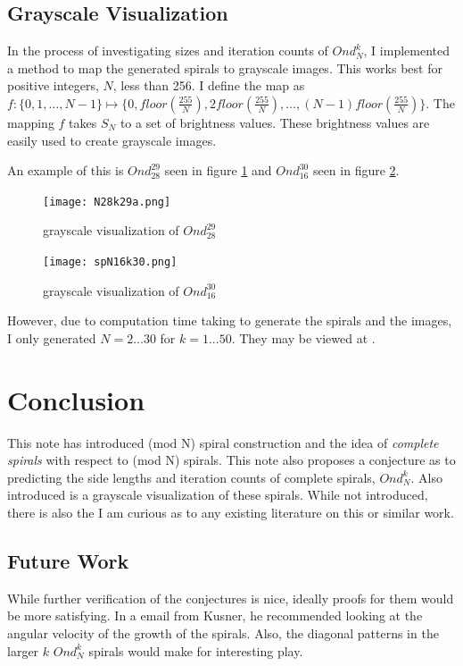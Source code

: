 \documentclass[11pt]{amsart}
\theoremstyle{mydef}
\begin{document}
\subsection{Grayscale Visualization}

In the process of investigating sizes and iteration counts of $Ond^k_N$, I implemented a method to map the generated spirals to grayscale images. This works best for positive integers, $N$, less than 256. I define the map as $f : \{ 0, 1, \ldots, N-1 \} \mapsto \{ 0, floor(\frac{255}{N}), 2floor(\frac{255}{N}), \ldots, (N-1)floor(\frac{255}{N}) \}$. The mapping $f$ takes $S_N$ to a set of brightness values. These brightness values are easily used to create grayscale images.

An example of this is $Ond^{29}_{28}$ seen in figure \ref{fig:viz2928} and $Ond^{30}_{16}$ seen in figure \ref{fig:viz1630}.

\begin{figure}[h]
\centering
\texttt{[image: N28k29a.png]}
\caption{grayscale visualization of $Ond^{29}_{28}$}
\label{fig:viz2928}
\end{figure}

\begin{figure}
\centering
\texttt{[image: spN16k30.png]}
\caption{grayscale visualization of $Ond^{30}_{16}$}
\label{fig:viz1630}
\end{figure}

However, due to computation time taking to generate the spirals and the images, I only generated $N=2...30$ for $k=1...50$. They may be viewed at \cite{GraySquare}.

\section{Conclusion}
This note has introduced (mod N) spiral construction and the idea of \textit{complete spirals} with respect to (mod N) spirals. This note also proposes a conjecture as to predicting the side lengths and iteration counts of complete spirals, $Ond^k_N$. Also introduced is a grayscale visualization of these spirals. While not introduced, there is also the I am curious as to any existing literature on this or similar work.

\subsection{Future Work}
While further verification of the conjectures is nice, ideally proofs for them would be more satisfying. In a email from Kusner, he recommended looking at the angular velocity of the growth  of the spirals. Also, the diagonal patterns in the larger $k$ $Ond^k_N$ spirals would make for interesting play.
\end{document}
